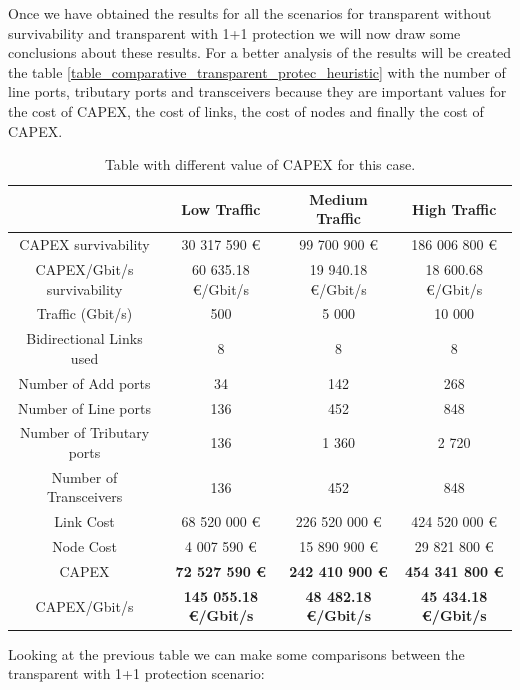 Once we have obtained the results for all the scenarios for transparent without survivability and transparent with 1+1 protection we will now draw some conclusions about these results. For a better analysis of the results will be created the table \ref{table_comparative_transparent_protec_heuristic} with the number of line ports, tributary ports and transceivers because they are important values for the cost of CAPEX, the cost of links, the cost of nodes and finally the cost of CAPEX.\\

\begin{table}[H]
\centering
\begin{tabular}{| c | c | c | c |}
 \hline
 & Low Traffic & Medium Traffic & High Traffic \\
 \hline\hline
 CAPEX survivability & 30 317 590 \euro & 99 700 900 \euro & 186 006 800 \euro \\ \hline
 CAPEX/Gbit/s survivability & 60 635.18 \euro/Gbit/s & 19 940.18 \euro/Gbit/s & 18 600.68 \euro/Gbit/s \\ \hline
 Traffic (Gbit/s) & 500 & 5 000 & 10 000 \\ \hline
 Bidirectional Links used & 8 & 8 & 8 \\ \hline
 Number of Add ports & 34 & 142 & 268 \\ \hline
 Number of Line ports & 136 & 452 & 848 \\ \hline
 Number of Tributary ports & 136 & 1 360 & 2 720 \\ \hline
 Number of Transceivers & 136 & 452 & 848 \\ \hline
 Link Cost & 68 520 000 \euro & 226 520 000 \euro & 424 520 000 \euro \\ \hline
 Node Cost & 4 007 590 \euro & 15 890 900 \euro & 29 821 800 \euro \\ \hline
 CAPEX & \textbf{72 527 590 \euro} & \textbf{242 410 900 \euro} & \textbf{454 341 800 \euro} \\ \hline
 CAPEX/Gbit/s & \textbf{145 055.18 \euro/Gbit/s} & \textbf{48 482.18 \euro/Gbit/s} & \textbf{45 434.18 \euro/Gbit/s} \\ \hline
\end{tabular}
\caption{Table with different value of CAPEX for this case.}
\label{table_comparative_transp_protec_heuristic}
\end{table}

\noindent
Looking at the previous table we can make some comparisons between the transparent with 1+1 protection scenario:

